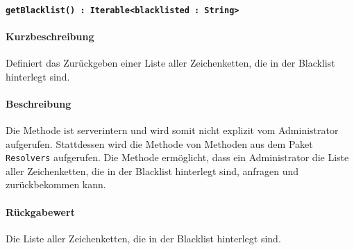 \paragraph{\texttt{getBlacklist() : Iterable<blacklisted : String>}}%
\paragraph*{Kurzbeschreibung}
Definiert das Zurückgeben einer Liste aller Zeichenketten, die in der Blacklist hinterlegt sind.
\paragraph*{Beschreibung}
Die Methode ist serverintern und wird somit nicht explizit vom Administrator aufgerufen.
Stattdessen wird die Methode von Methoden aus dem Paket \texttt{Resolvers} aufgerufen.
Die Methode ermöglicht, dass ein Administrator die Liste aller Zeichenketten, die in der Blacklist hinterlegt sind, anfragen und zurückbekommen kann.
\paragraph*{Rückgabewert}
Die Liste aller Zeichenketten, die in der Blacklist hinterlegt sind.
